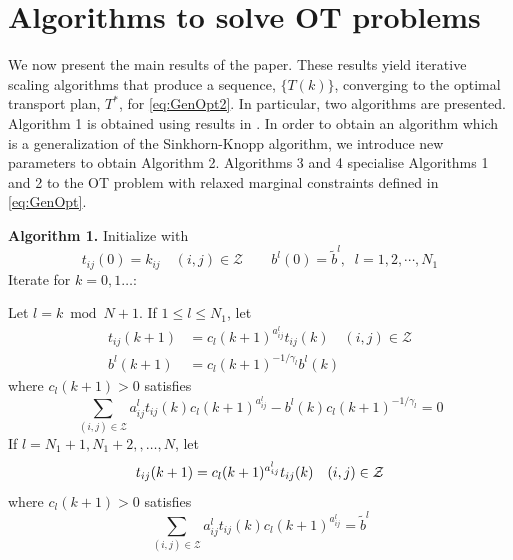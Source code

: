 \documentclass[twocolumn]{article}
\begin{document}
\section{Algorithms to solve  OT problems }
\label{sec:algore's_favorite_dance}
We now present the main results of the paper. These results yield iterative scaling algorithms that produce a sequence, $\{T(k)\}$, converging to the optimal transport plan, $T^*$, for 
\eqref{eq:GenOpt2}. 
In particular, two algorithms are presented. Algorithm 1 is obtained using results in \cite{Bregman1967}.
In order to obtain an algorithm which is a generalization of the Sinkhorn-Knopp algorithm, we introduce new parameters to obtain Algorithm 2.
Algorithms 3 and 4 specialise Algorithms 1 and 2 to the OT problem with relaxed marginal constraints defined in \eqref{eq:GenOpt}.



{\bf Algorithm 1.}
Initialize with 
\begin{equation*}
   t_{ij}(0) = k_{ij}\quad (i,j) \in {\mathcal Z} \qquad b^l(0) = \tilde{b}^l, \;\; l=1,2,\cdots,  N_1
\end{equation*} 
Iterate  for $k= 0, 1 \dots:$

Let $l = k\!\bmod N +1$.
\newline
If $1 \le l \le N_1$,
let
\begin{equation}
\begin{aligned}
\label{eq:tij(k+1)1}
t_{ij}(k+1) &= c_{l}(k+1)^{a^l_{ij}}  t_{ij}(k) \quad (i, j) \in {\mathcal Z}\\
b^l(k+1) &= c_{l}(k+1)^{-1/\gamma_l} b^l(k)
\end{aligned}
\end{equation}
where $c_{l}(k+1) >0$ satisfies
\begin{equation}
\label{eq:cl(k+1)1}
 \sum_{(i,j) \in {\mathcal Z}} a^l_{ij} t_{ij}(k) c_{l}(k+1)^{a^l_{ij}}   -b^l(k)c_{l}(k+1)^{-1/\gamma_l}  =0
\end{equation}
If  $l=N_1+1, N_1+2, ,\dots,  N$, let
\begin{equation}
\label{eq:tij(k+1)2}
t_{ij}(k+1) = c_{l}(k+1)^{a^l_{ij}}  t_{ij}(k) \quad (i, j) \in {\mathcal Z}\\
\end{equation}
where $c_{l}(k+1) >0$ satisfies
\begin{equation}
\label{eq:cl(k+1)2}
 \sum_{(i,j) \in {\mathcal Z}} a^l_{ij}  t_{ij}(k) c_{l}(k+1)^{a^l_{ij}}  = \tilde{b}^l
\end{equation}
\end{document}
